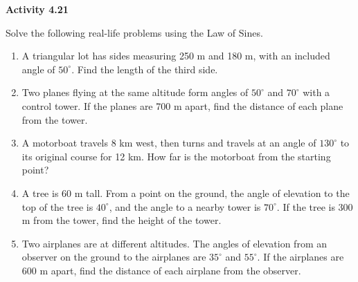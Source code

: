 \vspace{0.3ex}
\noindent\textbf{Activity 4.21}

\vspace{0.2ex}

Solve the following real-life problems using the Law of Sines.  

\begin{enumerate}
    \item A triangular lot has sides measuring 250 m and 180 m, with an included angle of \(50^\circ\). Find the length of the third side.
    \item Two planes flying at the same altitude form angles of \(50^\circ\) and \(70^\circ\) with a control tower. If the planes are 700 m apart, find the distance of each plane from the tower.
    \item A motorboat travels 8 km west, then turns and travels at an angle of \(130^\circ\) to its original course for 12 km. How far is the motorboat from the starting point?
    \item A tree is 60 m tall. From a point on the ground, the angle of elevation to the top of the tree is \(40^\circ\), and the angle to a nearby tower is \(70^\circ\). If the tree is 300 m from the tower, find the height of the tower.
    \item Two airplanes are at different altitudes. The angles of elevation from an observer on the ground to the airplanes are \(35^\circ\) and \(55^\circ\). If the airplanes are 600 m apart, find the distance of each airplane from the observer.
\end{enumerate}
